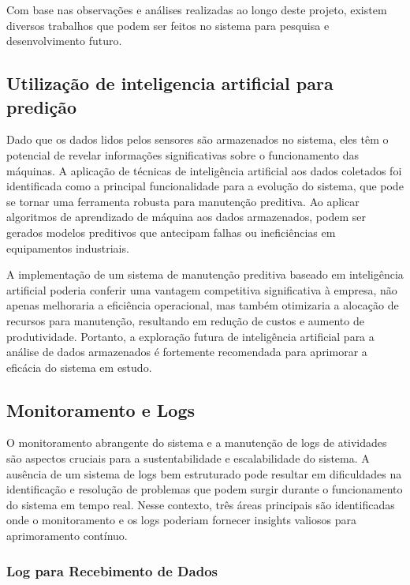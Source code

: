 Com base nas observações e análises realizadas ao longo deste projeto, existem diversos trabalhos que podem ser feitos no sistema para pesquisa e desenvolvimento futuro.


\subsection{Utilização de inteligencia artificial para predição}

Dado que os dados lidos pelos sensores são armazenados no sistema, eles têm o potencial de revelar informações significativas sobre o funcionamento das máquinas. A aplicação de técnicas de inteligência artificial aos dados coletados foi identificada como a principal funcionalidade para a evolução do sistema, que pode se tornar uma ferramenta robusta para manutenção preditiva. Ao aplicar algoritmos de aprendizado de máquina aos dados armazenados, podem ser gerados modelos preditivos que antecipam falhas ou ineficiências em equipamentos industriais.

A implementação de um sistema de manutenção preditiva baseado em inteligência artificial poderia conferir uma vantagem competitiva significativa à empresa, não apenas melhoraria a eficiência operacional, mas também otimizaria a alocação de recursos para manutenção, resultando em redução de custos e aumento de produtividade. Portanto, a exploração futura de inteligência artificial para a análise de dados armazenados é fortemente recomendada para aprimorar a eficácia do sistema em estudo.

\subsection{Monitoramento e Logs}

O monitoramento abrangente do sistema e a manutenção de logs de atividades são aspectos cruciais para a sustentabilidade e escalabilidade do sistema. A ausência de um sistema de logs bem estruturado pode resultar em dificuldades na identificação e resolução de problemas que podem surgir durante o funcionamento do sistema em tempo real. Nesse contexto, três áreas principais são identificadas onde o monitoramento e os logs poderiam fornecer insights valiosos para aprimoramento contínuo.

\subsubsection{Log para Recebimento de Dados}

